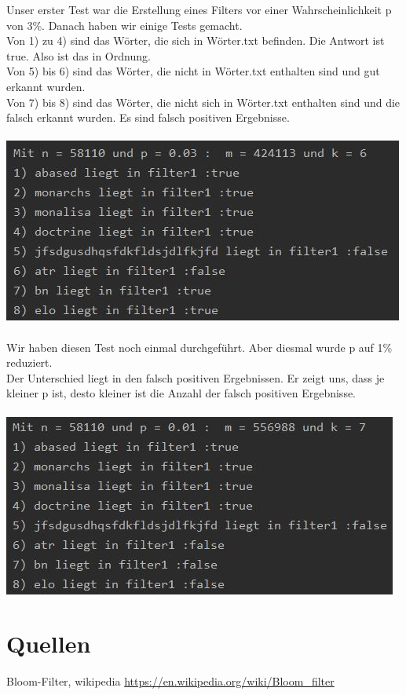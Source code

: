 \documentclass[12pt, letterpaper]{article}
\begin{document}
Unser erster Test war die Erstellung eines Filters vor einer Wahrscheinlichkeit p von 3\%. Danach haben wir einige Tests gemacht.\\
Von 1) zu 4) sind das Wörter, die sich in Wörter.txt befinden. Die Antwort ist true. Also ist das in Ordnung.\\
Von 5) bis 6) sind das Wörter, die nicht in Wörter.txt enthalten sind und gut erkannt wurden.\\
Von 7) bis 8) sind das Wörter, die nicht sich in Wörter.txt enthalten sind und die falsch erkannt wurden. Es sind falsch positiven Ergebnisse. \\ \\
\includegraphics{../Image/filter1}\\ \\
Wir haben diesen Test noch einmal durchgeführt. Aber diesmal wurde p auf 1\% reduziert.\\
Der Unterschied liegt in den falsch positiven Ergebnissen. Er zeigt uns, dass je kleiner p ist, desto kleiner ist die Anzahl der falsch positiven Ergebnisse.\\ \\
\includegraphics{../Image/filter2}

\section{Quellen}
Bloom-Filter, wikipedia \url{https://en.wikipedia.org/wiki/Bloom\_filter}
\end{document}
